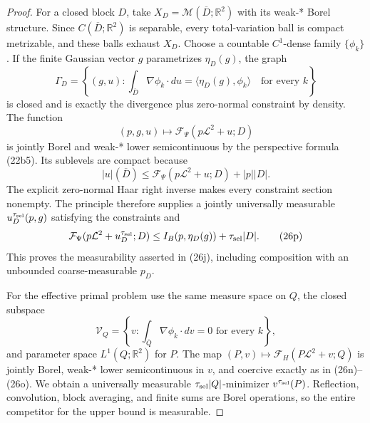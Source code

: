 \documentclass{smfart}
\theoremstyle{definition}
\newcommand{\1}{\mathbf 1}
\begin{document}
\begin{proof}
For a closed block $D$, take
$X_ D=\mathcal M(\overline D;\mathbb R^2)$ with its weak-* Borel
structure.  Since $C(\overline D;\mathbb R^2)$ is separable, every
total-variation ball is compact metrizable, and these balls exhaust
$X_ D$.  Choose a countable $C^1$-dense family $\{\phi_ k\}$.  If
the finite Gaussian vector $g$ parametrizes $\eta_ D(g)$, the graph
\begin{equation}
\Gamma_ D=\left\{(g,u):
\int_ {\overline D}\nabla\phi_ k\cdot du
=\langle\eta_ D(g),\phi_ k\rangle\quad\text{for every }k\right\}
\tag{26m}
\end{equation}
is closed and is exactly the divergence plus zero-normal constraint by
density.  The function
\begin{equation}
(p,g,u)\longmapsto\mathcal F_ \Psi(p\mathcal L^2+u;D)
\tag{26n}
\end{equation}
is jointly Borel and weak-* lower semicontinuous by the perspective
formula (22b5).  Its sublevels are compact because
\begin{equation}
|u|(\overline D)\leq
\mathcal F_ \Psi(p\mathcal L^2+u;D)+|p||D|.
\tag{26o}
\end{equation}
The explicit zero-normal Haar right inverse makes every constraint
section nonempty.  The principle therefore supplies a jointly
universally measurable $u_ D^{\tau_{\rm sel}}(p,g)$ satisfying the constraints
and
\begin{equation}
\mathcal F_ \Psi(p\mathcal L^2+u_ D^{\tau_{\rm sel}};D)
\leq I_ B(p,\eta_ D(g))+\tau_{\rm sel}|D|.
\tag{26p}
\end{equation}
This proves the measurability asserted in (26j), including composition
with an unbounded coarse-measurable $p_ D$.

For the effective primal problem use the same measure space on $Q$,
the closed subspace
\begin{equation*}
\mathscr V_ Q=\left\{v:\int_ {\overline Q}\nabla\phi_ k\cdot dv=0
\text{ for every }k\right\},
\end{equation*}
and parameter space $L^1(Q;\mathbb R^2)$ for $P$.  The map
$(P,v)\mapsto\mathcal F_ H(P\mathcal L^2+v;Q)$ is jointly Borel,
weak-* lower semicontinuous in $v$, and coercive exactly as in
(26n)--(26o).  We obtain a universally measurable
$\tau_{\rm sel}|Q|$-minimizer $v^{\tau_{\rm sel}}(P)$.  Reflection, convolution,
block averaging, and finite sums are Borel operations, so the entire
competitor for the upper bound is measurable.


\end{proof}
\end{document}
